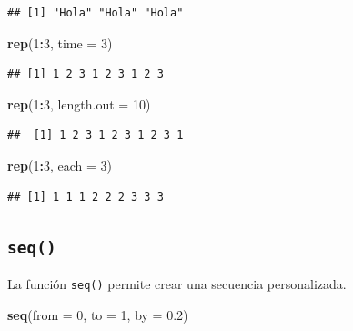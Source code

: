 \documentclass[]{book}
\newenvironment{Shaded}{\begin{snugshade}}{\end{snugshade}}
\newcommand{\KeywordTok}[1]{\textcolor[rgb]{0.13,0.29,0.53}{\textbf{#1}}}
\newcommand{\DataTypeTok}[1]{\textcolor[rgb]{0.13,0.29,0.53}{#1}}
\newcommand{\DecValTok}[1]{\textcolor[rgb]{0.00,0.00,0.81}{#1}}
\newcommand{\FloatTok}[1]{\textcolor[rgb]{0.00,0.00,0.81}{#1}}
\newcommand{\OperatorTok}[1]{\textcolor[rgb]{0.81,0.36,0.00}{\textbf{#1}}}
\newcommand{\NormalTok}[1]{#1}
\begin{document}
\begin{verbatim}
## [1] "Hola" "Hola" "Hola"
\end{verbatim}

\begin{Shaded}
\begin{Highlighting}[]
\KeywordTok{rep}\NormalTok{(}\DecValTok{1}\OperatorTok{:}\DecValTok{3}\NormalTok{, }\DataTypeTok{time =} \DecValTok{3}\NormalTok{)}
\end{Highlighting}
\end{Shaded}

\begin{verbatim}
## [1] 1 2 3 1 2 3 1 2 3
\end{verbatim}

\begin{Shaded}
\begin{Highlighting}[]
\KeywordTok{rep}\NormalTok{(}\DecValTok{1}\OperatorTok{:}\DecValTok{3}\NormalTok{, }\DataTypeTok{length.out =} \DecValTok{10}\NormalTok{)}
\end{Highlighting}
\end{Shaded}

\begin{verbatim}
##  [1] 1 2 3 1 2 3 1 2 3 1
\end{verbatim}

\begin{Shaded}
\begin{Highlighting}[]
\KeywordTok{rep}\NormalTok{(}\DecValTok{1}\OperatorTok{:}\DecValTok{3}\NormalTok{, }\DataTypeTok{each =} \DecValTok{3}\NormalTok{)}
\end{Highlighting}
\end{Shaded}

\begin{verbatim}
## [1] 1 1 1 2 2 2 3 3 3
\end{verbatim}

\subsection{\texorpdfstring{\texttt{seq()}}{seq()}}\label{l015seq}

La función \texttt{seq()} permite crear una secuencia personalizada.

\begin{Shaded}
\begin{Highlighting}[]
\KeywordTok{seq}\NormalTok{(}\DataTypeTok{from =} \DecValTok{0}\NormalTok{, }\DataTypeTok{to =} \DecValTok{1}\NormalTok{, }\DataTypeTok{by =} \FloatTok{0.2}\NormalTok{)}
\end{Highlighting}
\end{Shaded}
\end{document}

